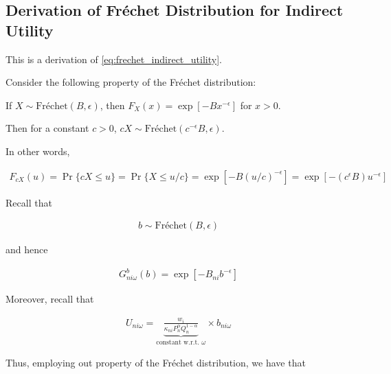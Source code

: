 \documentclass[10pt]{article}
\begin{document}

\subsection{Derivation of Fréchet Distribution for Indirect Utility}
\label{sec:frechet_indirect_utility}

This is a derivation of \eqref{eq:frechet_indirect_utility}.

Consider the following property of 
the Fréchet distribution:



\begin{notes}
    If $X \sim \text{Fréchet}(B, \epsilon)$, then $F_X(x)=\exp \left[-B x^{-\epsilon}\right]$ for $x>0$.

    Then for a constant $c>0$, $cX \sim \text{Fréchet}\left(c^{-\epsilon} B, \epsilon\right)$.
    
    In other words, 

    \begin{align}
        F_{c X}(u)=\operatorname{Pr}\{c X \leq u\}=\operatorname{Pr}\{X \leq u / c\}=\exp \left[-B(u / c)^{-\epsilon}\right]=\exp \left[-\left(c^{\epsilon} B\right) u^{-\epsilon}\right]
    \end{align}

\end{notes}


Recall that

\begin{align}
    b \sim \text{Fréchet}(B, \epsilon)
\end{align}

and hence

\begin{align}
    G^b_{n i \omega}(b)=\exp \left[-B_{n i} b^{-\epsilon}\right]
\end{align}

Moreover, recall that

\begin{align}
    U_{n i \omega}=\underbrace{\frac{w_i}{\kappa_{n i} P_n^\alpha Q_n^{1-\alpha}}}_{\text {constant w.r.t. } \omega} \times b_{n i \omega}
\end{align}

Thus, employing out property of the Fréchet distribution, we have that
\end{document}
